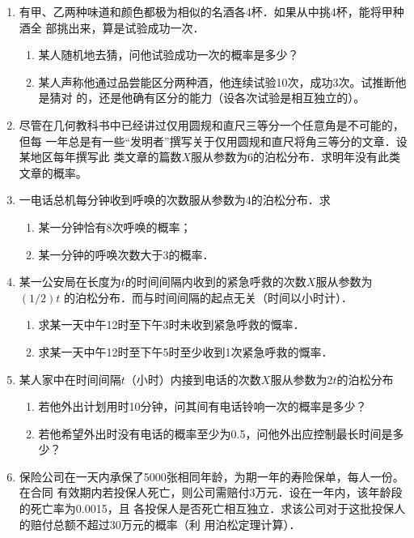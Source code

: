 \documentclass[10pt,a4paper]{article}
\begin{document}
\begin{enumerate}
    \item 有甲、乙两种味道和颜色都极为相似的名酒各4杯．如果从中挑4杯，能将甲种酒全
    部挑出来，算是试验成功一次．
    \begin{enumerate}
        \item 某人随机地去猜，问他试验成功一次的概率是多少？
        \item 某人声称他通过品尝能区分两种酒，他连续试验10次，成功3次。试推断他是猜对
        的，还是他确有区分的能力（设各次试验是相互独立的）。 
    \end{enumerate}


    \item 尽管在几何教科书中已经讲过仅用圆规和直尺三等分一个任意角是不可能的，但每
    一年总是有一些“发明者”撰写关于仅用圆规和直尺将角三等分的文章．设某地区每年撰写此
    类文章的篇数$X$服从参数为6的泊松分布．求明年没有此类文章的概率。


    \item 一电话总机每分钟收到呼唤的次数服从参数为4的泊松分布．求
    \begin{enumerate}
        \item 某一分钟恰有8次呼唤的概率；
        \item 某一分钟的呼唤次数大于3的概率．
    \end{enumerate}


    \item 某一公安局在长度为$t$的时间间隔内收到的紧急呼救的次数$X$服从参数为$(1/2)t$
    的泊松分布．而与时间间隔的起点无关（时间以小时计）．
    \begin{enumerate}
        \item 求某一天中午12时至下午3时未收到紧急呼救的慨率．
        \item 求某一天中午12时至下午5时至少收到1次紧急呼救的慨率．
    \end{enumerate}



    \item 某人家中在时间间隔$t$（小时）内接到电话的次数$X$服从参数为$2t$的泊松分布
    \begin{enumerate}
        \item 若他外出计划用时10分钟，问其间有电话铃响一次的概率是多少？
        \item 若他希望外出时没有电话的概率至少为0.5，问他外出应控制最长时间是多少？
    \end{enumerate}



    \item 保险公司在一天内承保了5000张相同年龄，为期一年的寿险保单，每人一份。在合同
    有效期内若投保人死亡，则公司需赔付3万元．设在一年内，该年龄段的死亡率为0.0015，且
    各投保人是否死亡相互独立．求该公司对于这批投保人的赔付总额不超过30万元的概率（利
    用泊松定理计算）．


\end{enumerate}
\end{document}
